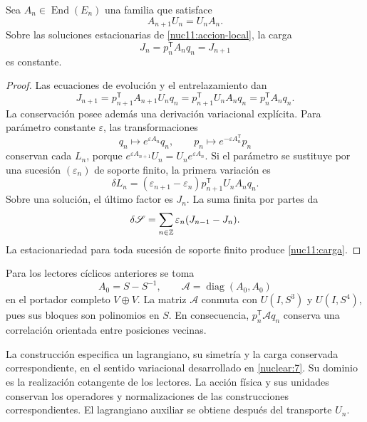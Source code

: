 \begin{proposition}
\label{nuc11:noether}
Sea \(A_n\in\operatorname{End}(E_n)\) una familia que satisface
\[
 A_{n+1}U_n=U_nA_n.
\]
Sobre las soluciones estacionarias de
\eqref{nuc11:accion-local}, la carga
\begin{equation}
 \boxed{J_n=p_n^{\mathsf T}A_nq_n=J_{n+1}}
 \label{nuc11:carga}
\end{equation}
es constante.
\end{proposition}
\begin{proof}
Las ecuaciones de evolución y el entrelazamiento dan
\[
 J_{n+1}
 =p_{n+1}^{\mathsf T}A_{n+1}U_nq_n
 =p_{n+1}^{\mathsf T}U_nA_nq_n
 =p_n^{\mathsf T}A_nq_n.
\]
La conservación posee además una derivación variacional explícita.
Para parámetro constante \(\varepsilon\), las transformaciones
\[
 q_n\mapsto e^{\varepsilon A_n}q_n,\qquad
 p_n\mapsto e^{-\varepsilon A_n^{\mathsf T}}p_n
\]
conservan cada \(L_n\), porque
\(e^{\varepsilon A_{n+1}}U_n=U_ne^{\varepsilon A_n}\).
Si el parámetro se sustituye por una sucesión
\((\varepsilon_n)\) de soporte finito, la primera variación es
\[
 \delta L_n
 =(\varepsilon_{n+1}-\varepsilon_n)
   p_{n+1}^{\mathsf T}U_nA_nq_n.
\]
Sobre una solución, el último factor es \(J_n\).
La suma finita por partes da
\[
 \delta\mathscr S
 =\sum_{n\in\mathbb Z}\varepsilon_n(J_{n-1}-J_n).
\]
La estacionariedad para toda sucesión de soporte finito produce
\eqref{nuc11:carga}.
\end{proof}

Para los lectores cíclicos anteriores se toma
\[
 A_0=S-S^{-1},\qquad
 \mathcal A=\operatorname{diag}(A_0,A_0)
\]
en el portador completo \(V\oplus V\).
La matriz \(\mathcal A\) conmuta con \(U(I,S^3)\) y
\(U(I,S^4)\), pues sus bloques son polinomios en \(S\).
En consecuencia, \(p_n^{\mathsf T}\mathcal A q_n\) conserva
una correlación orientada entre posiciones vecinas.

La construcción especifica un lagrangiano, su simetría y la carga
conservada correspondiente, en el sentido variacional desarrollado
en \cref{nuclear:7}.
Su dominio es la realización cotangente de los lectores.
La acción física y sus unidades conservan los operadores y
normalizaciones de las construcciones correspondientes.
El lagrangiano auxiliar se obtiene después del transporte \(U_n\).
